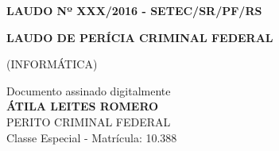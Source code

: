\documentclass[hidelinks,brazilian,12pt,a4paper,final]{article}
\begin{document}
	\thispagestyle{first}
	\noindent\textbf{LAUDO Nº XXX/2016 - SETEC/SR/PF/RS}
	
	\begin{center}
		\textbf{LAUDO DE PERÍCIA CRIMINAL FEDERAL}
	
		(INFORMÁTICA)
	\end{center}
		
	
	
	\clearpage
	\tableofcontents
	\clearpage
	
	
	
	
	\begin{center}
		Documento assinado digitalmente\\
		\textbf{ÁTILA LEITES ROMERO}\\
		PERITO CRIMINAL FEDERAL\\
		Classe Especial - Matrícula: 10.388\\
	\end{center}
\end{document}
